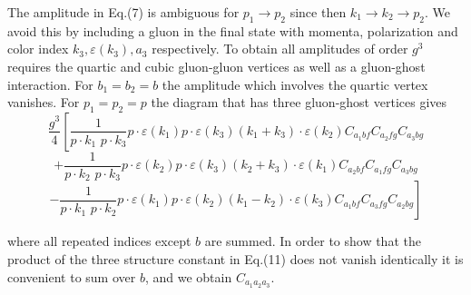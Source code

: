 \documentclass[a4paper,12pt]{article}
\begin{document}
The amplitude in Eq.(7) is ambiguous for $p_{1} \rightarrow p_{2}$ since then $k_{1} \rightarrow k_{2} \rightarrow p_{2}$.  We avoid this by including a gluon in the final state with momenta, polarization and color index $k_{3}, \varepsilon (k_{3}), a_{3}$ respectively.  To obtain all amplitudes of order $g^{3}$ requires the quartic and cubic gluon-gluon vertices as well as a gluon-ghost interaction.  For $b_{1}=b_{2}=b$ the amplitude which involves the quartic vertex vanishes.  For $p_{1}=p_{2}=p$ the diagram that has three gluon-ghost vertices gives
\begin{displaymath}
\frac{g^{3}}{4} \left[ \frac{1}{p \cdot k_{1} \, \, p \cdot k_{3}} p \cdot \varepsilon (k_{1}) p \cdot \varepsilon (k_{3})  (k_{1} + k_{3}) \cdot \varepsilon (k_{2})  C_{a_{1}bf} C_{a_{2}fg} C_{a_{3}bg}
\right .
\end{displaymath}
\begin{displaymath}
+ \frac{1}{p \cdot k_{2} \, \, p \cdot k_{3}} p \cdot \varepsilon (k_{2}) p \cdot \varepsilon (k_{3})  (k_{2} + k_{3}) \cdot \varepsilon (k_{1})  C_{a_{2}bf} C_{a_{1}fg} C_{a_{3}bg}
\end{displaymath}
\begin{equation}
\left .
- \frac{1}{p \cdot k_{1} \, \, p \cdot k_{2}} p \cdot \varepsilon (k_{1}) p \cdot \varepsilon (k_{2})  (k_{1} - k_{2}) \cdot \varepsilon (k_{3})  C_{a_{1}bf} C_{a_{3}fg} C_{a_{2}bg} \right]
\end{equation}

where all repeated indices except $b$ are summed.  In order to show that the product of the three structure constant in Eq.(11) does not vanish identically it is convenient to sum over $b$, and we obtain $C_{a_{1}a_{2}a_{3}}$.
\end{document}
